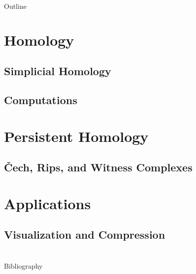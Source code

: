 






\begin{frame}
    \titlepage
\end{frame}

\begin{frame}{Outline}
	\tableofcontents
\end{frame}

\section[Homology]{Homology}
\subsection{Simplicial Homology}
\begin{frame}
\end{frame}
\subsection{Computations}
\begin{frame}
\end{frame}


\section[Persistence]{Persistent Homology}
\subsection{\v{C}ech, Rips, and Witness Complexes}
\begin{frame}
\end{frame}

\section{Applications}
\subsection{Visualization and Compression}
\begin{frame}
\end{frame}

\section{}
\begin{frame}{Bibliography}
	\nocite{wagner}
	\nocite{hatcher}
	\nocite{singh}
	\begingroup
	\renewcommand{\section}[2]{}%
	
	\endgroup
\end{frame}





